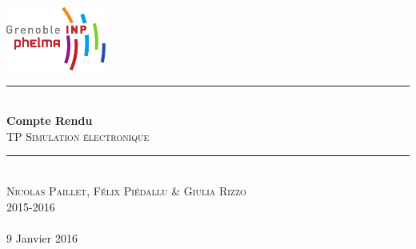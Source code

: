 \begin{titlepage}
    \vspace*{-10px}
    \includegraphics[height=80px]{logo_phelma.pdf}
    \vspace*{-80px}
\begin{flushright}
    \vspace*{60px}
\end{flushright}

\vspace*{0.5cm}
\begin{center}
\rule{\linewidth}{0.5mm}\\[0.4cm]
{\huge{\bfseries Compte Rendu}\\[0.4cm]
\textsc{TP Simulation électronique}\\[0.4cm]}
\rule{\linewidth}{0.5mm}\\[0.5cm]

\LARGE{\textsc{Nicolas Paillet, Félix Piédallu \& Giulia Rizzo}}\\[0.7cm]
\large{\textsc{2015-2016}}\\[2cm]

\Large{~}\\[1cm]

\large{9 Janvier 2016}\\[2cm]


\end{center}
\end{titlepage}

\tableofcontents        %
\newpage
{}  %
